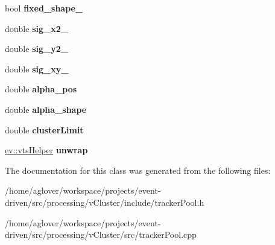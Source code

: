 \begin{DoxyCompactItemize}
\item 
bool {\bfseries fixed\+\_\+shape\+\_\+}\hypertarget{classTrackerPool_af83ad39640f58a747253b85046083140}{}\label{classTrackerPool_af83ad39640f58a747253b85046083140}

\item 
double {\bfseries sig\+\_\+x2\+\_\+}\hypertarget{classTrackerPool_a6a92ea09387253159839324143b6206a}{}\label{classTrackerPool_a6a92ea09387253159839324143b6206a}

\item 
double {\bfseries sig\+\_\+y2\+\_\+}\hypertarget{classTrackerPool_a3181cb8343949ab80181c9028ae114fa}{}\label{classTrackerPool_a3181cb8343949ab80181c9028ae114fa}

\item 
double {\bfseries sig\+\_\+xy\+\_\+}\hypertarget{classTrackerPool_a9018c85457b2616efe8f718f1602b32a}{}\label{classTrackerPool_a9018c85457b2616efe8f718f1602b32a}

\item 
double {\bfseries alpha\+\_\+pos}\hypertarget{classTrackerPool_ad67aaae3b2c777330ccb4abb9bf60884}{}\label{classTrackerPool_ad67aaae3b2c777330ccb4abb9bf60884}

\item 
double {\bfseries alpha\+\_\+shape}\hypertarget{classTrackerPool_ad134dda445a2b5eea2d2101a6e5c2132}{}\label{classTrackerPool_ad134dda445a2b5eea2d2101a6e5c2132}

\item 
double {\bfseries cluster\+Limit}\hypertarget{classTrackerPool_a6c9e6cdff31c0ab40c19f54d30d315cc}{}\label{classTrackerPool_a6c9e6cdff31c0ab40c19f54d30d315cc}

\item 
\hyperlink{classev_1_1vtsHelper}{ev\+::vts\+Helper} {\bfseries unwrap}\hypertarget{classTrackerPool_afec5b627c70b35454cecd812b3913c59}{}\label{classTrackerPool_afec5b627c70b35454cecd812b3913c59}

\end{DoxyCompactItemize}


The documentation for this class was generated from the following files\+:\begin{DoxyCompactItemize}
\item 
/home/aglover/workspace/projects/event-\/driven/src/processing/v\+Cluster/include/tracker\+Pool.\+h\item 
/home/aglover/workspace/projects/event-\/driven/src/processing/v\+Cluster/src/tracker\+Pool.\+cpp\end{DoxyCompactItemize}
